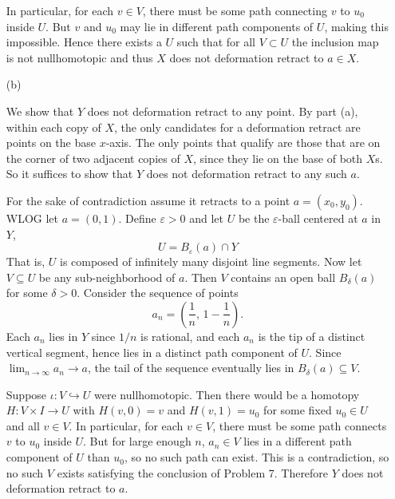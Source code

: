\documentclass[12pt]{article}
\begin{document}
\begin{solution}
\begin{enumerate}
        In particular, for each $v \in V$, there must be some path connecting $v$ to $u_0$ inside $U$. But $v$ and $u_0$ may lie in different path components of $U$, making this impossible. Hence there exists a $U$ such that for all $V \subset U$ the inclusion map is not nullhomotopic and thus $X$ does not deformation retract to $a \in X$. 

        \item[(b)] 
        

        
        
        We show that $Y$ does not deformation retract to any point. By
        part (a), within each copy of $X$, the only candidates for a deformation retract are points on the base $x$-axis. The only points that qualify are those that are on the corner of two adjacent copies of $X$, since they lie on the base of both $X$s. So it suffices to show that $Y$ does not deformation retract to any such $a$.
        
        For the sake of contradiction assume it retracts to a point $a = (x_0, y_0)$. WLOG let $a = (0,1)$.
        Define $\varepsilon > 0$ and let $U$ be the $\varepsilon$-ball centered at $a$ in $Y$, 
        \[U = B_\varepsilon(a) \cap Y\]
        That is, $U$ is composed of infinitely many disjoint line segments. Now let $V \subseteq U$ be any sub-neighborhood of $a$. Then $V$ contains an open ball $B_\delta(a)$ for some $\delta > 0$. Consider the sequence of points
        \[
            a_n = \left(\frac{1}{n},\, 1 - \frac{1}{n}\right).
        \]
        Each $a_n$ lies in $Y$ since $1/n$ is rational, and each $a_n$ is the tip of a distinct vertical segment, hence lies in a distinct path component of $U$. Since $\lim_{n \to \infty} a_n \to a$, the tail of the sequence eventually lies in $B_\delta(a) \subseteq V$.
        
        Suppose $\iota: V \hookrightarrow U$ were nullhomotopic. Then
        there would be a homotopy $H: V \times I \to U$ with $H(v, 0) = v$
        and $H(v, 1) = u_0$ for some fixed $u_0 \in U$ and all $v \in V$. In particular, for each $v \in V$, there must be some path 
        connects $v$ to $u_0$ inside $U$. But for large enough $n$, $a_n\in V$ lies in a different path component of $U$ than $u_0$, so no such path can exist. This is a contradiction, so no such $V$ exists satisfying the conclusion of Problem 7. Therefore $Y$ does not deformation retract to $a$.
    \end{enumerate}
\end{solution}
\end{document}

